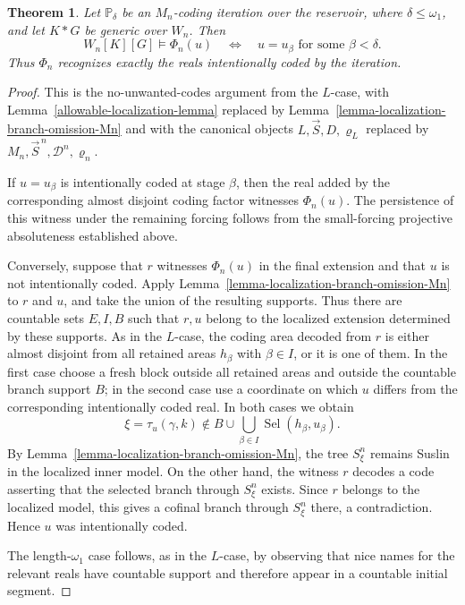 \documentclass[a4paper,11pt]{article}
\newtheorem{theorem}{Theorem}[section]
\newcommand{\forceP}{\mathbb{P}}
\begin{document}
\begin{theorem}
\label{theorem-no-unwanted-Mn-codes}
Let $\forceP_\delta$ be an $M_n$-coding iteration over the reservoir, where
$\delta\leq\omega_1$, and let $K*G$ be generic over $W_n$.  Then
\[
   W_n[K][G]\models\Phi_n(u)
   \quad\Longleftrightarrow\quad
   u=u_\beta\text{ for some }\beta<\delta.
\]
Thus $\Phi_n$ recognizes exactly the reals intentionally coded by the
iteration.
\end{theorem}

\begin{proof}
This is the no-unwanted-codes argument from the $L$-case, with
Lemma~\ref{allowable-localization-lemma} replaced by
Lemma~\ref{lemma-localization-branch-omission-Mn} and with the canonical
objects $L,\vec S,D,\varrho_L$ replaced by
$M_n,\vec S^{\,n},\mathcal D^n,\varrho_n$.

If $u=u_\beta$ is intentionally coded at stage $\beta$, then the real added by
the corresponding almost disjoint coding factor witnesses $\Phi_n(u)$.
The persistence of this witness under the remaining forcing follows from the
small-forcing projective absoluteness established above.

Conversely, suppose that $r$ witnesses $\Phi_n(u)$ in the final extension and
that $u$ is not intentionally coded.  Apply
Lemma~\ref{lemma-localization-branch-omission-Mn} to $r$ and $u$, and
take the union of the resulting supports.  Thus there are countable sets
$E,I,B$ such that $r,u$ belong to the localized extension determined by these
supports.  As in the $L$-case, the coding area decoded from $r$ is either
almost disjoint from all retained areas $h_\beta$ with $\beta\in I$, or it is
one of them.  In the first case choose a fresh block outside all retained
areas and outside the countable branch support $B$; in the second case use a
coordinate on which $u$ differs from the corresponding intentionally coded
real.  In both cases we obtain
\[
   \xi=\tau_u(\gamma,k)
   \notin
   B\cup\bigcup_{\beta\in I}\operatorname{Sel}(h_\beta,u_\beta).
\]
By Lemma~\ref{lemma-localization-branch-omission-Mn}, the tree
$S^n_\xi$ remains Suslin in the localized inner model.  On the other hand,
the witness $r$ decodes a code asserting that the selected branch through
$S^n_\xi$ exists.  Since $r$ belongs to the localized model, this gives a
cofinal branch through $S^n_\xi$ there, a contradiction.  Hence $u$ was
intentionally coded.

The length-$\omega_1$ case follows, as in the $L$-case, by observing that
nice names for the relevant reals have countable support and therefore appear
in a countable initial segment.
\end{proof}
\end{document}
